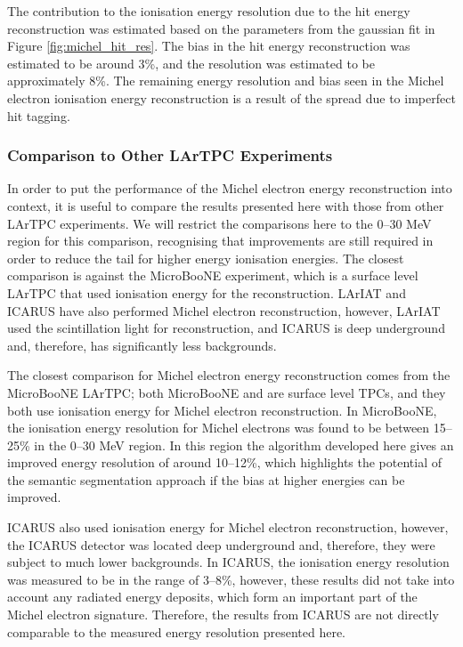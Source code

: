 The contribution to the ionisation energy resolution due to the hit energy
reconstruction was estimated based on the parameters from the gaussian fit in
Figure \ref{fig:michel_hit_res}. The bias in the hit energy reconstruction was 
estimated to be around 3\%, and the resolution was estimated to be 
approximately 8\%. The remaining energy resolution and bias seen in the Michel 
electron ionisation energy reconstruction is a result of the spread due to 
imperfect hit tagging.

\subsubsection*{Comparison to Other LArTPC Experiments} \label{ME_COMP}

In order to put the performance of the Michel electron energy
reconstruction into context, it is useful to compare the results presented 
here with those from other LArTPC experiments. We will restrict the 
comparisons here to the 0--30 MeV region for this comparison, recognising that 
improvements are still required in order to reduce the tail for higher energy 
ionisation energies.  The closest comparison is against the MicroBooNE 
experiment, which is a surface level LArTPC that used ionisation energy for 
the reconstruction\cite{Acciarri:2017sjy}. LArIAT and ICARUS have also performed 
Michel electron reconstruction\cite{Amoruso:2003sw,Foreman_2016}, however, 
LArIAT used the scintillation light for reconstruction, and ICARUS is deep 
underground and, therefore, has significantly less backgrounds.

The closest comparison for Michel electron energy reconstruction comes from the
MicroBooNE LArTPC; both MicroBooNE and \protodune{} are surface level TPCs, and
they both use ionisation energy for Michel electron reconstruction. In
MicroBooNE, the ionisation energy resolution for Michel electrons was found to
be between 15--25\% in the 0--30 MeV region\cite{Acciarri:2017sjy}. In this region
the algorithm developed here gives an improved energy resolution of around
10--12\%, which highlights the potential of the semantic segmentation approach 
if the bias at higher energies can be improved.

ICARUS also used ionisation energy for Michel electron reconstruction, however,
the ICARUS detector was located deep underground and, therefore, they were
subject to much lower backgrounds. In ICARUS, the ionisation energy resolution 
was measured to be in the range of 3--8\%\cite{Amoruso:2003sw}, however, these
results did not take into account any radiated energy deposits, which form an
important part of the Michel electron signature. Therefore, the results from
ICARUS are not directly comparable to the measured energy resolution presented
here.

